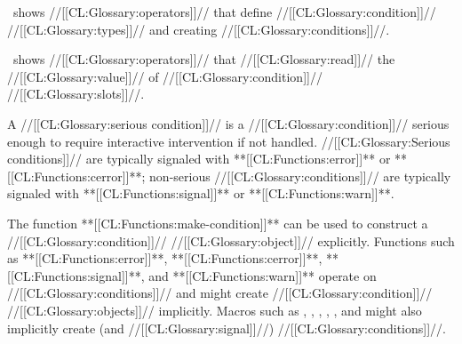 \Thenextfigure\ shows //[[CL:Glossary:operators]]// that
define //[[CL:Glossary:condition]]// //[[CL:Glossary:types]]// and creating //[[CL:Glossary:conditions]]//.


\Thenextfigure\ shows //[[CL:Glossary:operators]]// that //[[CL:Glossary:read]]// 
the //[[CL:Glossary:value]]// of //[[CL:Glossary:condition]]// //[[CL:Glossary:slots]]//.





A //[[CL:Glossary:serious condition]]// is a //[[CL:Glossary:condition]]// serious
enough to require interactive intervention if not handled.  
//[[CL:Glossary:Serious conditions]]// are typically signaled with **[[CL:Functions:error]]** or **[[CL:Functions:cerror]]**;
non-serious //[[CL:Glossary:conditions]]// are typically signaled with **[[CL:Functions:signal]]** or **[[CL:Functions:warn]]**.



\endsubsubsection%

\endSubsection%


The function **[[CL:Functions:make-condition]]** can be used to construct
a //[[CL:Glossary:condition]]// //[[CL:Glossary:object]]// explicitly.  Functions such as **[[CL:Functions:error]]**,
**[[CL:Functions:cerror]]**, **[[CL:Functions:signal]]**, and **[[CL:Functions:warn]]** operate on
//[[CL:Glossary:conditions]]// and might create //[[CL:Glossary:condition]]// //[[CL:Glossary:objects]]//
implicitly.  Macros such as , ,
, , , and
 might also implicitly create (and //[[CL:Glossary:signal]]//)
//[[CL:Glossary:conditions]]//.
 

